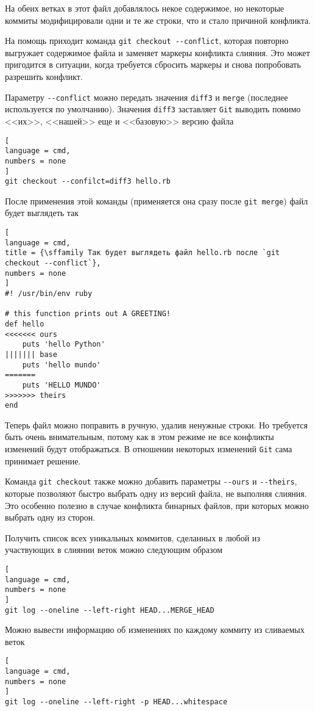 \documentclass[%
	11pt,
	a4paper,
	utf8,
		]{article}
\begin{document}
На обеих ветках в этот файл добавлялось некое содержимое, но некоторые коммиты модифицировали одни и те же строки, что и стало причиной конфликта.

На помощь приходит команда \verb|git checkout --conflict|, которая повторно выгружает содержимое файла и заменяет маркеры конфликта слияния. Это может пригодится в ситуации, когда требуется сбросить маркеры и снова попробовать разрешить конфликт. 

Параметру \verb|--conflict| можно передать значения \texttt{diff3} и \texttt{merge} (последнее используется по умолчанию). Значения \texttt{diff3} заставляет \texttt{Git} выводить помимо <<их>>, <<нашей>> еще и <<базовую>> версию файла
\begin{lstlisting}[
language = cmd,
numbers = none
]
git checkout --confilct=diff3 hello.rb
\end{lstlisting}

После применения этой команды (применяется она сразу после \texttt{git merge}) файл будет выглядеть так
\begin{lstlisting}[
language = cmd,
title = {\sffamily Так будет выглядеть файл hello.rb после `git checkout --conflict`},
numbers = none
]
#! /usr/bin/env ruby

# this function prints out A GREETING!
def hello
<<<<<<< ours
    puts 'hello Python'
||||||| base
    puts 'hello mundo'
=======
    puts 'HELLO MUNDO'
>>>>>>> theirs
end
\end{lstlisting}

Теперь файл можно поправить в ручную, удалив ненужные строки. Но требуется быть очень внимательным, потому как в этом режиме не все конфликты изменений будут отображаться. В отношении некоторых изменений \texttt{Git} сама принимает решение.

Команда \texttt{git checkout} также можно добавить параметры \verb|--ours| и \verb|--theirs|, которые позволяют быстро выбрать одну из версий файла, не выполняя слияния. Это особенно полезно в случае конфликта бинарных файлов, при которых можно выбрать одну из сторон.

Получить список всех уникальных коммитов, сделанных в любой из участвующих в слиянии веток можно следующим образом
\begin{lstlisting}[
language = cmd,
numbers = none
]
git log --oneline --left-right HEAD...MERGE_HEAD
\end{lstlisting}

Можно вывести информацию об изменениях по каждому коммиту из сливаемых веток
\begin{lstlisting}[
language = cmd,
numbers = none
]
git log --oneline --left-right -p HEAD...whitespace
\end{lstlisting}
\end{document}

